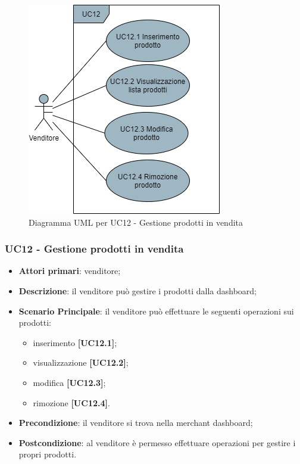 \begin{figure}[H]
\centering
\includegraphics[scale=0.6]{res/UseCase/Immagini/GestioneProdotti}
\caption{Diagramma UML per UC12 - Gestione prodotti in vendita}
\end{figure}

\subsubsection{UC12 - Gestione prodotti in vendita}
\begin{itemize}
\item \textbf{Attori primari}: venditore;
\item \textbf{Descrizione}: il venditore può gestire i prodotti dalla dashboard;
\item \textbf{Scenario Principale}: il venditore può effettuare le seguenti operazioni sui prodotti:
\begin{itemize}
	\item inserimento \textbf{[UC12.1]};
	\item visualizzazione \textbf{[UC12.2]};
	\item modifica \textbf{[UC12.3]};
	\item rimozione \textbf{[UC12.4]}.
\end{itemize}
\item \textbf{Precondizione}: il venditore si trova nella merchant dashboard;
\item \textbf{Postcondizione}: al venditore è permesso effettuare operazioni per gestire i propri prodotti.
\end{itemize}


